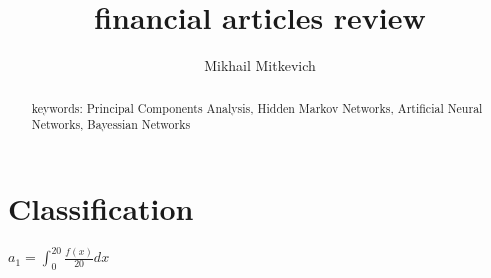 \documentclass[]{article}
\title{financial articles review}
\author{Mikhail Mitkevich}
\begin{document}
\maketitle

\begin{abstract}
keywords: Principal Components Analysis, Hidden Markov Networks, Artificial Neural Networks, Bayessian Networks
\end{abstract}

\section{Classification}


$a_1 = \int_0^20\frac{f(x)}{20}dx$
\end{document}
